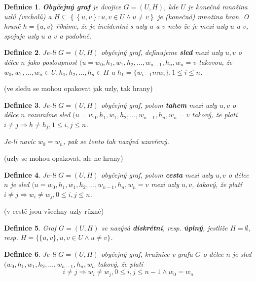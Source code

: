 \documentclass[a4paper, 11pt]{report}
\newtheorem{mydef}{Definice}[chapter]
\begin{document}
\begin{mydef}
\textbf{Obyčejný graf} je dvojice $G=(U, H)$, kde $U$ je konečná množina uzlů (vrcholů) a $H \subseteq \left\{ \left\{u, v\right\}: u, v \in U \land u \not= v \right\}$ je (konečná) množina hran. O hraně $h = \{u, v\}$ říkáme, že je incidentní s uzly $u$ a $v$ nebo že je mezi uzly $u$ a $v$, spojuje uzly $u$ a $v$ a podobně.
\end{mydef}

\begin{mydef}
Je-li $G=(U, H)$ obyčejný graf, definujeme \textbf{sled} mezi uzly $u, v$ o délce $n$ jako posloupnost $(u=w_0, h_1, w_1, h_2, \dots, w_{n-1}, h_n, w_n = v$ takovou, že  $w_0, w_1, \dots, w_n \in U, h_1, h_2, \dots, h_n \in H$ a $h_1 = \{w_{i-1}m w_i\}, 1 \leq i \leq n$.
\end{mydef}
(ve sledu se mohou opakovat jak uzly, tak hrany)

\begin{mydef}
Je-li $G=(U, H)$ obyčejný graf, potom \textbf{tahem} mezi uzly $u, v$ o délce $n$ rozumíme sled $(u=w_0, h_1, w_1, h_2, \dots, w_{n-1}, h_n, w_n = v$ takový, že platí $i \not= j \Rightarrow h \not= h_j, 1 \leq i, j \leq n$.

Je-li navíc $w_0 = w_n$, pak se tento tah nazývá uzavřený.
\end{mydef}

(uzly se mohou opakovat, ale ne hrany)

\begin{mydef}
Je-li $G=(U, H)$ obyčejný graf, potom \textbf{cesta} mezi uzly  $u, v$ o délce $n$ je sled $(u=w_0, h_1, w_1, h_2, \dots, w_{n-1}, h_n, w_n = v$ mezi uzly $u, v$, takový, že platí $i \not= j \Rightarrow w_i \not= w_j, 0 \leq i, j \leq n$.
\end{mydef}

(v cestě jsou všechny uzly různé)

\begin{mydef}
Graf $G=(U, H)$ se nazývá \textbf{diskrétní}, resp. \textbf{úplný}, jestliže $H = \emptyset$, resp. $H=\{\{u, v\}, u, v \in U \land u \not= v\}$.
\end{mydef}

\begin{mydef}
Je-li $G=(U, H)$ obyčejný graf, kružnice v grafu $G$ o délce $n$ je sled $(w_0, h_1, w_1, h_2, \dots, w_{n-1}, h_n, w_n$ takový, že platí
$$ i \not= j \Rightarrow w_i \not=w_j, 0 \leq i,j \leq n -1 \land w_0 = w_n$$
\end{mydef}
\end{document}
